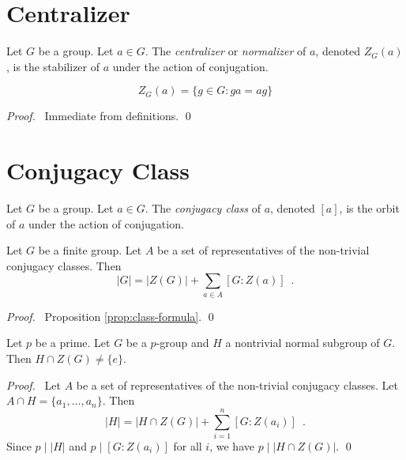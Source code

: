 \section{Centralizer}

\begin{df}[Centralizer]
Let $G$ be a group. Let $a \in G$. The \emph{centralizer} or \emph{normalizer} of $a$, denoted $Z_G(a)$, is the stabilizer of $a$ under the action of conjugation.
\end{df}

\begin{prop}
\[ Z_G(a) = \{ g \in G : ga = ag \} \]
\end{prop}

\begin{proof}
\pf\ Immediate from definitions. \qed
\end{proof}

\section{Conjugacy Class}

\begin{df}
Let $G$ be a group. Let $a \in G$. The \emph{conjugacy class} of $a$, denoted $[a]$, is the orbit of $a$ under the action of conjugation.
\end{df}

\begin{prop}
Let $G$ be a finite group. Let $A$ be a set of representatives of the non-trivial conjugacy classes. Then
\[ |G| = |Z(G)| + \sum_{a \in A} [G : Z(a)] \enspace . \]
\end{prop}

\begin{proof}
\pf\ Proposition \ref{prop:class-formula}. \qed
\end{proof}

\begin{cor}
Let $p$ be a prime. Let $G$ be a $p$-group and $H$ a nontrivial normal subgroup of $G$. Then $H \cap Z(G) \neq \{e\}$.
\end{cor}

\begin{proof}
\pf\ Let $A$ be a set of representatives of the non-trivial conjugacy classes. Let $A \cap H = \{a_1, \ldots, a_n\}$. Then
\[ |H| = |H \cap Z(G)| + \sum_{i=1}^n [G : Z(a_i)] \enspace . \]
Since $p \mid |H|$ and $p \mid [G : Z(a_i)]$ for all $i$, we have $p \mid |H \cap Z(G)|$. \qed
\end{proof}

